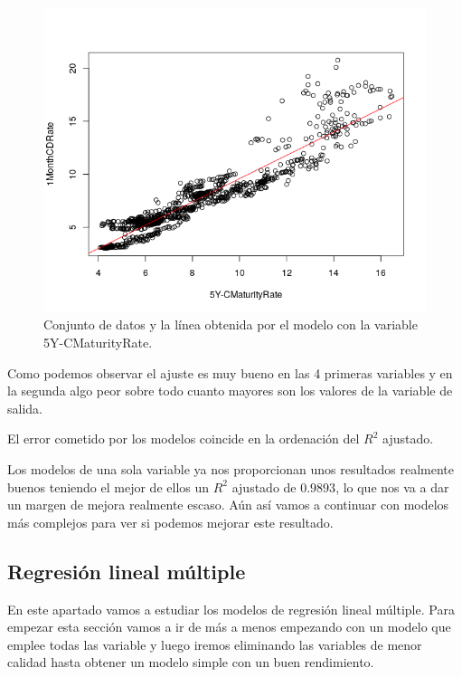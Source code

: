 \documentclass[12pt,a4paper]{article}
\begin{document}
\begin{figure}[H]
	\centering 
	\includegraphics[scale=0.65]{./Imagenes/Regresion/abline_5Y_CMaturityRate.png}
	\caption{Conjunto de datos y la línea obtenida por el modelo con la variable 5Y-CMaturityRate.}
\end{figure}

Como podemos observar el ajuste es muy bueno en las 4 primeras variables y en la segunda algo peor sobre todo cuanto mayores son los valores de la variable de salida.

El error cometido por los modelos coincide en la ordenación del $R^2$ ajustado.

Los modelos de una sola variable ya nos proporcionan unos resultados realmente buenos teniendo el mejor de ellos un $R^2$ ajustado de $0.9893$, lo que nos va a dar un margen de mejora realmente escaso. Aún así vamos a continuar con modelos más complejos para ver si podemos mejorar este resultado.

\subsection{Regresión lineal múltiple}

En este apartado vamos a estudiar los modelos de regresión lineal múltiple. Para empezar esta sección vamos a ir de más a menos empezando con un modelo que emplee todas las variable y luego iremos eliminando las variables de menor calidad hasta obtener un modelo simple con un buen rendimiento.
\end{document}
